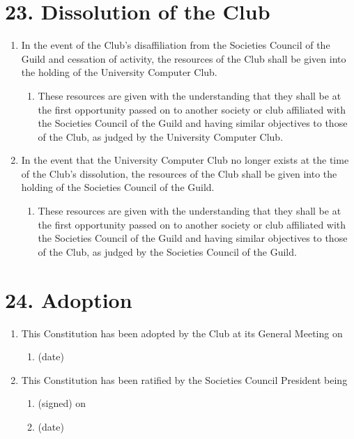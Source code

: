 \documentclass[12pt]{article}
\begin{document}
\section{23. Dissolution of the Club}
\begin{enumerate}[label=23.\arabic*]
    \item In the event of the Club's disaffiliation from the Societies Council of the Guild and cessation of activity, the resources of the Club shall be given into the holding of the University Computer Club.
    \begin{enumerate}[label=\theenumi.\arabic*]
        \item These resources are given with the understanding that they shall be at the first opportunity passed on to another society or club affiliated with the Societies Council of the Guild and having similar objectives to those of the Club, as judged by the University Computer Club.
    \end{enumerate}
    \item In the event that the University Computer Club no longer exists at the time of the Club's dissolution, the resources of the Club shall be given into the holding of the Societies Council of the Guild.
    \begin{enumerate}[label=\theenumi.\arabic*]
        \item These resources are given with the understanding that they shall be at the first opportunity passed on to another society or club affiliated with the Societies Council of the Guild and having similar objectives to those of the Club, as judged by the Societies Council of the Guild.
    \end{enumerate}
\end{enumerate}

\section{24. Adoption}
\begin{enumerate}[label=24.\arabic*]
     \item This Constitution has been adopted by the Club at its General Meeting on
    \begin{enumerate}[label=24.1.\arabic*]
     \item \hspace{1cm} \makebox[3cm]{\hrulefill} (date)
    \end{enumerate}
   \item This Constitution has been ratified by the Societies Council President being
    \begin{enumerate}[label=24.2.\arabic*]
     \item \hspace{1cm} \makebox[3cm]{\hrulefill} (signed) on 
     \item \hspace{1cm} \makebox[3cm]{\hrulefill} (date)
    \end{enumerate}
\end{enumerate}
\end{document}
